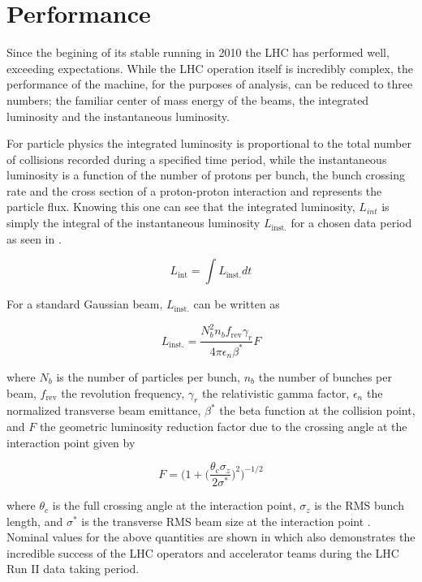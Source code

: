 \section{Performance} \label{sec:lhc:performance}

Since the begining of its stable running in 2010 the LHC has performed well,
exceeding expectations.  While the LHC operation itself is incredibly complex,
the performance of the machine, for the purposes of analysis, can be reduced to
three numbers; the familiar center of mass energy of the beams, the integrated
luminosity and the instantaneous luminosity.  

For particle physics the integrated luminosity is proportional to the total
number of collisions recorded during a specified time period, while the
instantaneous luminosity is a function of the number of protons per bunch, the
bunch crossing rate and the cross section of a proton-proton interaction and
represents the particle flux.  Knowing this one can see that the integrated
luminosity, $L_{int}$ is simply the integral of the instantaneous luminosity
$L_{\text{inst.}}$ for a chosen data period as seen in
.

\begin{equation} \label{eq:integrated_luminosity}
   L_{\text{int}} = \int L_{\text{inst.}}dt 
\end{equation}

For a standard Gaussian beam, $L_{\text{inst.}}$ can be written as

\begin{equation} \label{eq:inst_luminosity}
  L_{\text{inst.}} = \frac{N_{b}^{2}n_{b}f_{\text{rev}}\gamma_{r}}{4\pi\epsilon_{n}\beta^{*}}F
\end{equation}

where $N_{b}$ is the number of particles per bunch, $n_{b}$ the number of
bunches per beam, $f_{\text{rev}}$ the revolution frequency, $\gamma_{r}$ the
relativistic gamma factor, $\epsilon_{n}$ the normalized transverse beam
emittance, $\beta^{*}$ the beta function at the collision point, and $F$ the
geometric luminosity reduction factor due to the crossing angle at the
interaction point given by

\begin{equation}
  F = \bigg(1 + \Big( \frac{\theta_{c}\sigma_{z}}{2\sigma^{*}} \Big) ^{2}
\bigg)^{-1/2} 
\end{equation}

where $\theta_{c}$ is the full crossing angle at the interaction point,
$\sigma_{z}$ is the RMS bunch length, and $\sigma^{*}$ is the transverse RMS
beam size at the interaction point \cite{Evans:2008zzb}. Nominal values for the
above quantities are shown in  which also
demonstrates the incredible success of the LHC operators and accelerator teams
during the LHC Run II data taking period.

